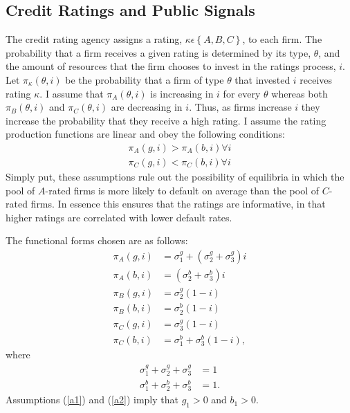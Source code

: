 \documentclass[notitlepage]{article}
\begin{document}
\subsection{Credit Ratings and Public Signals}
The credit rating agency assigns a rating, $\kappa\epsilon\left\{A,B,C\right\}$, to each firm. The probability that a firm receives a given rating is determined by its type, $\theta$, and the amount of resources that the firm chooses to invest in the ratings process, $i$. Let $\pi_{\kappa}(\theta,i)$ be the probability that a firm of type $\theta$ that invested $i$ receives rating $\kappa$. I assume that $\pi_{A}(\theta,i)$ is increasing in $i$ for every $\theta$ whereas both $\pi_{B}(\theta,i)$ and $\pi_{C}(\theta,i)$ are decreasing in $i$. Thus, as firms increase $i$ they increase the probability that they receive a high rating. I assume the rating production functions are linear and obey the following conditions:
\begin{align} 
\label{a1}\pi_{A}(g,i)>\pi_{A}(b,i) \forall i \\
\label{a2}\pi_{C}(g,i)<\pi_{C}(b,i) \forall i 
\end{align}
Simply put, these assumptions rule out the possibility of equilibria in which the pool of $A$-rated firms is more likely to default on average than the pool of $C$-rated firms. In essence this ensures that the ratings are informative, in that higher ratings are correlated with lower default rates.

The functional forms chosen are as follows:
\begin{align*}
	\pi_{A}(g,i) & = \sigma^{g}_{1} + (\sigma^{g}_{2}+\sigma^{g}_{3})i\\
	\pi_{A}(b,i) & =         (\sigma^{b}_{2}+\sigma^{b}_{3})i\\
	\pi_{B}(g,i) & =          \sigma^{g}_{2}(1-i )\\
	\pi_{B}(b,i) & =          \sigma^{b}_{2}(1-i )\\
	\pi_{C}(g,i) & =          \sigma^{g}_{3}(1-i )\\
	\pi_{C}(b,i) & = \sigma^{b}_{1} +  \sigma^{b}_{3}(1-i ),
\end{align*}
where
\begin{align*}
\sigma^{g}_{1}+\sigma^{g}_{2}+\sigma^{g}_{3} & =1\\
\sigma^{b}_{1}+\sigma^{b}_{2}+\sigma^{b}_{3} & =1.
\end{align*}
Assumptions (\ref{a1}) and (\ref{a2}) imply that $g_{1}>0$ and $b_{1}>0$.
\end{document}
